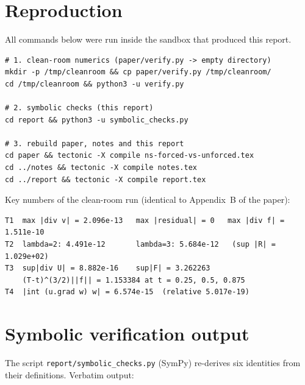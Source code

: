 \documentclass[11pt,a4paper]{article}
\begin{document}
\appendix

\section{Reproduction}\label{app:rep}

All commands below were run inside the sandbox that produced this report.

\begin{verbatim}
# 1. clean-room numerics (paper/verify.py -> empty directory)
mkdir -p /tmp/cleanroom && cp paper/verify.py /tmp/cleanroom/
cd /tmp/cleanroom && python3 -u verify.py

# 2. symbolic checks (this report)
cd report && python3 -u symbolic_checks.py

# 3. rebuild paper, notes and this report
cd paper && tectonic -X compile ns-forced-vs-unforced.tex
cd ../notes && tectonic -X compile notes.tex
cd ../report && tectonic -X compile report.tex
\end{verbatim}

Key numbers of the clean-room run (identical to Appendix~B of the paper):
\begin{verbatim}
T1  max |div v| = 2.096e-13   max |residual| = 0   max |div f| = 1.511e-10
T2  lambda=2: 4.491e-12       lambda=3: 5.684e-12   (sup |R| = 1.029e+02)
T3  sup|div U| = 8.882e-16    sup|F| = 3.262263
    (T-t)^(3/2)||f|| = 1.153384 at t = 0.25, 0.5, 0.875
T4  |int (u.grad w) w| = 6.574e-15  (relative 5.017e-19)
\end{verbatim}

\section{Symbolic verification output}\label{app:sym}

The script \texttt{report/symbolic\_checks.py} (SymPy) re-derives six identities from their
definitions. Verbatim output:
\end{document}
